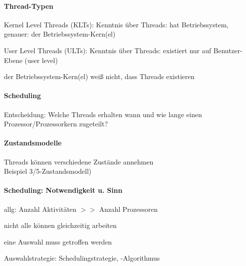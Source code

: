 \documentclass[a4paper]{article}
\begin{document}
\begin{multicols}{3}
  \paragraph{Thread-Typen}
  \begin{itemize*}
    \item Kernel Level Threads (KLTs): Kenntnis über Threads: hat Betriebssystem, genauer: der Betriebssystem-Kern(el)
    \item User Level Threads (ULTs): Kenntnis über Threads: existiert nur auf Benutzer-Ebene (user level)
    \item der Betriebssystem-Kern(el) weiß nicht, dass Threads existieren
  \end{itemize*}

  \paragraph{Scheduling}
  Entscheidung: Welche Threads erhalten wann und wie lange einen Prozessor/Prozessorkern zugeteilt?

  \paragraph{Zustandsmodelle}
  Threads können verschiedene Zustände annehmen\\
  Beispiel 3/5-Zustandsmodell)

  \paragraph{Scheduling: Notwendigkeit u. Sinn}
  \begin{itemize*}
    \item allg: Anzahl Aktivitäten $>>$ Anzahl Prozessoren
    \item nicht alle können gleichzeitig arbeiten
    \item eine Auswahl muss getroffen werden
    \item Auswahlstrategie: Schedulingstrategie, -Algorithmus
  \end{itemize*}


\end{multicols}
\end{document}
